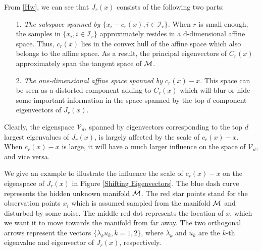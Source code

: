\documentclass[aos,preprint]{imsart}
\theoremstyle{remark}
\begin{document}
From \eqref{Hw}, we can see that $J_r(x)$ consists of the following two parts:
\begin{itemize}
\item[1.] {\it The subspace spanned by $\{x_i-c_r(x), i\in {\mathcal I}_r\}$.} 
When $r$ is small enough, the samples in $\{x_i, i\in {\mathcal I}_r\}$ approximately resides in a d-dimensional affine space. Thus, $c_r(x)$ lies in the convex hull of the affine space which also belongs to the affine space. As a result, the principal eigenvectors of $C_r(x)$ approximately span the tangent space of $\cal M$.%
\item[2.]{\it The one-dimensional affine space spanned by $c_r(x)-x$.}
This space can be seen as a distorted component adding to $C_r(x)$ which will blur or hide some important information in the space spanned by the top $d$ component eigenvectors of $J_r(x)$.
\end{itemize}
Clearly, the eigenspace ${\mathcal V}_d$, spanned by eigenvectors corresponding to the top $d$ largest eigenvalues of $J_r(x)$, is largely affected by the scale of $c_r(x)-x$. When $c_r(x)-x$ is large, it will have a much larger influence on the space of ${\mathcal V}_d$, and vice versa. 

We give an example to illustrate the influence the scale of $c_r(x)-x$ on the eigenspace of $J_r(x)$ in Figure \ref{Shifting Eigenvectors}. The blue dash curve represents the hidden unknown manifold $\cal M$. The red star points stand for the observation points $x_i$ which is assumed sampled from the manifold $\cal M$ and disturbed by some noise. The middle red dot represents the location of $x$, which we want it to move towards the manifold from far away. The two orthogonal arrows represent the vectors $\{\lambda_k u_k, k=1,2\}$, where $\lambda_k$ and $u_k$ are the $k$-th eigenvalue and eigenvector of $J_r(x)$, respectively.
\end{document}
